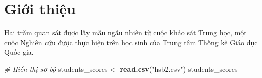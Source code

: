 \documentclass[
]{article}
\newenvironment{Shaded}{\begin{snugshade}}{\end{snugshade}}
\newcommand{\CommentTok}[1]{\textcolor[rgb]{0.56,0.35,0.01}{\textit{#1}}}
\newcommand{\KeywordTok}[1]{\textcolor[rgb]{0.13,0.29,0.53}{\textbf{#1}}}
\newcommand{\NormalTok}[1]{#1}
\newcommand{\StringTok}[1]{\textcolor[rgb]{0.31,0.60,0.02}{#1}}
\begin{document}
\hypertarget{giux1edbi-thiux1ec7u}{%
\section{Giới thiệu}\label{giux1edbi-thiux1ec7u}}

Hai trăm quan sát được lấy mẫu ngẫu nhiên từ cuộc khảo sát Trung học,
một cuộc Nghiên cứu được thực hiện trên học sinh của Trung tâm Thống kê
Giáo dục Quốc gia.

\begin{Shaded}
\begin{Highlighting}[]
\CommentTok{# Hiển thị sơ bộ}
\NormalTok{students_scores <-}\StringTok{ }\KeywordTok{read.csv}\NormalTok{(}\StringTok{"hsb2.csv"}\NormalTok{)}
\NormalTok{students_scores}
\end{Highlighting}
\end{Shaded}
\end{document}
